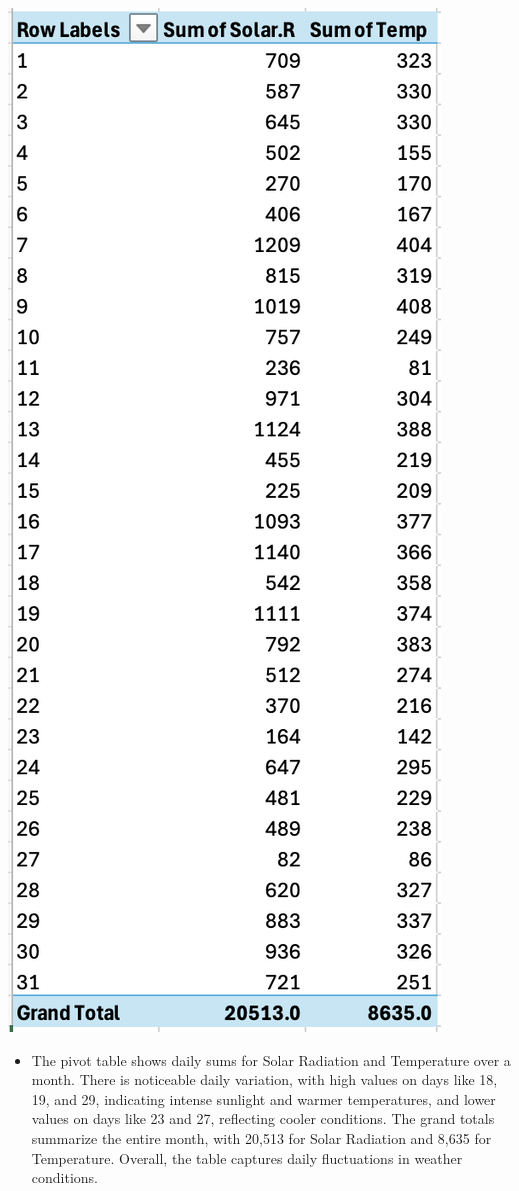 \documentclass[
  letterpaper,
  DIV=11,
  numbers=noendperiod]{scrreprt}
\providecommand{\tightlist}{%
  \setlength{\itemsep}{0pt}\setlength{\parskip}{0pt}}\usepackage{longtable,booktabs,array}
\begin{document}
\includegraphics{pivot1_table_baruga.png}

\begin{itemize}
\tightlist
\item
  The pivot table shows daily sums for Solar Radiation and Temperature
  over a month. There is noticeable daily variation, with high values on
  days like 18, 19, and 29, indicating intense sunlight and warmer
  temperatures, and lower values on days like 23 and 27, reflecting
  cooler conditions. The grand totals summarize the entire month, with
  20,513 for Solar Radiation and 8,635 for Temperature. Overall, the
  table captures daily fluctuations in weather conditions.
\end{itemize}
\end{document}
